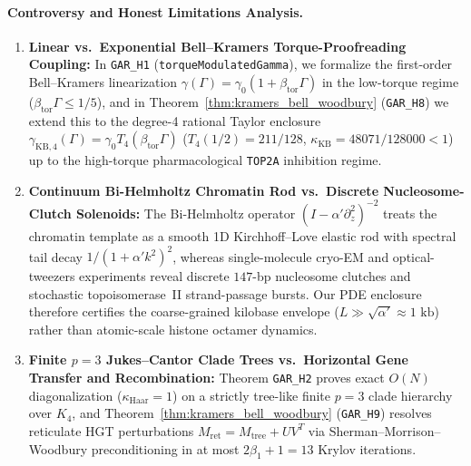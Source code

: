 \documentclass[11pt,a4paper]{article}
\theoremstyle{definition}
\begin{document}
\paragraph{Controversy and Honest Limitations Analysis.}
\begin{enumerate}
  \item \textbf{Linear vs.\ Exponential Bell--Kramers Torque-Proofreading Coupling:} In \texttt{GAR\_H1} (\texttt{torqueModulatedGamma}), we formalize the first-order Bell--Kramers linearization $\gamma(\Gamma) = \gamma_0(1 + \beta_{\mathrm{tor}}\Gamma)$ in the low-torque regime ($\beta_{\mathrm{tor}}\Gamma \le 1/5$), and in Theorem~\ref{thm:kramers_bell_woodbury} (\texttt{GAR\_H8}) we extend this to the degree-4 rational Taylor enclosure $\gamma_{\mathrm{KB},4}(\Gamma) = \gamma_0 T_4(\beta_{\mathrm{tor}}\Gamma)$ ($T_4(1/2) = 211/128$, $\kappa_{\mathrm{KB}} = 48071/128000 < 1$) up to the high-torque pharmacological \texttt{TOP2A} inhibition regime.
  \item \textbf{Continuum Bi-Helmholtz Chromatin Rod vs.\ Discrete Nucleosome-Clutch Solenoids:} The Bi-Helmholtz operator $(I - \alpha'\partial_z^2)^{-2}$ treats the chromatin template as a smooth 1D Kirchhoff--Love elastic rod with spectral tail decay $1/(1+\alpha' k^2)^2$, whereas single-molecule cryo-EM and optical-tweezers experiments reveal discrete $147$-bp nucleosome clutches and stochastic topoisomerase~II strand-passage bursts. Our PDE enclosure therefore certifies the coarse-grained kilobase envelope ($L \gg \sqrt{\alpha'} \approx 1\text{ kb}$) rather than atomic-scale histone octamer dynamics.
  \item \textbf{Finite $p=3$ Jukes--Cantor Clade Trees vs.\ Horizontal Gene Transfer and Recombination:} Theorem \texttt{GAR\_H2} proves exact $O(N)$ diagonalization ($\kappa_{\mathrm{Haar}} = 1$) on a strictly tree-like finite $p=3$ clade hierarchy over $K_4$, and Theorem~\ref{thm:kramers_bell_woodbury} (\texttt{GAR\_H9}) resolves reticulate HGT perturbations $M_{\mathrm{ret}} = M_{\mathrm{tree}} + UV^T$ via Sherman--Morrison--Woodbury preconditioning in at most $2\beta_1 + 1 = 13$ Krylov iterations.

\end{enumerate}
\end{document}
